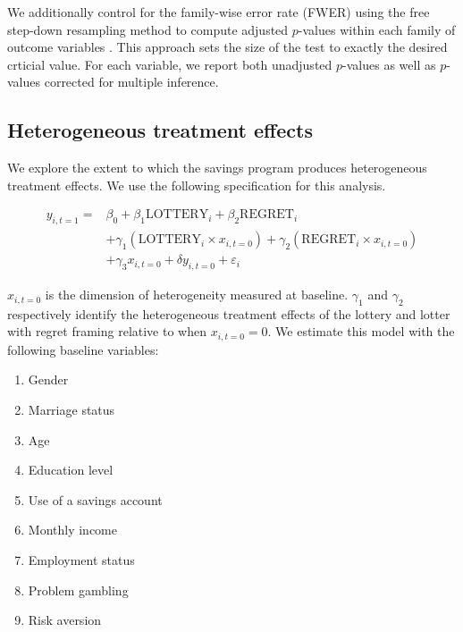 \documentclass[10pt]{article}
\begin{document}
		We additionally control for the family-wise error rate (FWER) using the free step-down resampling method to compute adjusted $p$-values within each family of outcome variables . This approach sets the size of the test to exactly the desired crticial value. For each variable, we report both unadjusted $p$-values as well as $p$-values corrected for multiple inference.

	\subsection{Heterogeneous treatment effects}

		We explore the extent to which the savings program produces heterogeneous treatment effects. We use the following specification for this analysis.

		\begin{equation} \begin{split}
		y_{i,t=1} = & \beta_{0} + \beta_{1}\text{LOTTERY}_{i} + \beta_{2}\text{REGRET}_{i} \\
					& + \gamma_{1}(\text{LOTTERY}_{i} \times x_{i,t=0}) + \gamma_{2}(\text{REGRET}_{i} \times x_{i,t=0}) \\ 
					& + \gamma_{3}x_{i,t=0} + \delta y_{i,t=0} + \varepsilon_{i}
		\end{split} \label{eq:heteffect} \end{equation}

		$x_{i,t=0}$ is the dimension of heterogeneity measured at baseline. $\gamma_{1}$ and $\gamma_{2}$ respectively identify the heterogeneous treatment effects of the lottery and lotter with regret framing relative to when $x_{i,t=0} = 0$. We estimate this model with the following baseline variables:

		\begin{enumerate}
		\item Gender
		\item Marriage status
		\item Age
		\item Education level
		\item Use of a savings account
		\item Monthly income
		\item Employment status
		\item Problem gambling
		\item Risk aversion
		\end{enumerate}

\end{document}
